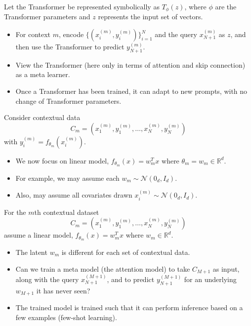 \documentclass[12pt]{extarticle}
\begin{document}
Let the Transformer be represented symbolically as $T_{\phi}(z)$, where $\phi$ are the Transformer parameters and $z$ represents the input set of vectors.

\begin{itemize}
    \item For context $m$, encode $\{(x_i^{(m)}, y_i^{(m)})\}_{i=1}^{N}$ and the query $x_{N+1}^{(m)}$ as $z$, and then use the Transformer to predict $y_{N+1}^{(m)}$.
    
    \item View the Transformer (here only in terms of attention and skip connection) as a meta learner.
    
    \item Once a Transformer has been trained, it can adapt to new prompts, with no change of Transformer parameters.
\end{itemize}

Consider contextual data
\[
C_m = (x_1^{(m)}, y_1^{(m)}, \ldots, x_N^{(m)}, y_N^{(m)})
\]
with $y_i^{(m)} = f_{\theta_m}(x_i^{(m)})$.

\begin{itemize}
    \item We now focus on linear model, $f_{\theta_m}(x) = w_m^T x$ where $\theta_m = w_m \in \mathbb{R}^d$.
    
    \item For example, we may assume each $w_m \sim \mathcal{N}(0_d, I_d)$.
    
    \item Also, may assume all covariates drawn $x_i^{(m)} \sim \mathcal{N}(0_d, I_d)$.
\end{itemize}

For the $m$th contextual dataset
\[
C_m = (x_1^{(m)}, y_1^{(m)}, \ldots, x_N^{(m)}, y_N^{(m)})
\]
assume a linear model, $f_{\theta_m}(x) = w_m^T x$ where $w_m \in \mathbb{R}^d$.

\begin{itemize}
    \item The latent $w_m$ is different for each set of contextual data.
    
    \item Can we train a meta model (the attention model) to take $C_{M+1}$ as input, along with the query $x_{N+1}^{(M+1)}$, and to predict $y_{N+1}^{(M+1)}$ for an underlying $w_{M+1}$ it has never seen?
    
    \item The trained model is trained such that it can perform inference based on a few examples (few-shot learning).
\end{itemize}
\end{document}
